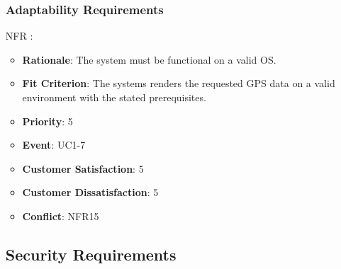 \documentclass[12pt, titlepage]{article}
\newcounter{reqnum} %
\newcounter{freqnum} %
\begin{document}
\begin{itemize}
\subsubsection{Adaptability Requirements}
\item[NFR\refstepcounter{freqnum}\thefreqnum
\label{NFR}:] 
\begin{itemize}
    \item \textbf{Rationale}: The system must be functional on a valid OS.
    \item \textbf{Fit Criterion}: The systems renders the requested GPS data on a valid environment with the stated prerequisites.
    \item \textbf{Priority}: 5
    \item \textbf{Event}: UC1-7%
    \item \textbf{Customer Satisfaction}: 5
    \item \textbf{Customer Dissatisfaction}: 5
    \item \textbf{Conflict}: NFR15
\end{itemize}
\subsection{Security Requirements}


\end{itemize}
\end{document}
